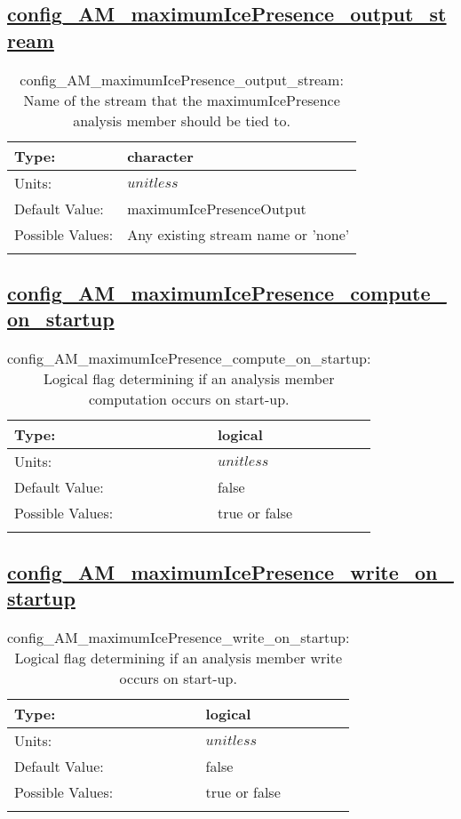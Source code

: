 \subsection[config\_AM\_maximumIcePresence\_output\_stream]{\hyperref[sec:nm_tab_AM_maximumIcePresence]{config\_AM\_maximumIcePresence\_output\_stream}}
\label{subsec:nm_sec_config_AM_maximumIcePresence_output_stream}
\begin{center}
\begin{longtable}{| p{2.0in} || p{4.0in} |}
    \hline
    Type: & character \\
    \hline
    Units: & $unitless$ \\
    \hline
    Default Value: & maximumIcePresenceOutput \\
    \hline
    Possible Values: & Any existing stream name or 'none' \\
    \hline
    \caption{config\_AM\_maximumIcePresence\_output\_stream: Name of the stream that the maximumIcePresence analysis member should be tied to.}
\end{longtable}
\end{center}
\subsection[config\_AM\_maximumIcePresence\_compute\_on\_startup]{\hyperref[sec:nm_tab_AM_maximumIcePresence]{config\_AM\_maximumIcePresence\_compute\_on\_startup}}
\label{subsec:nm_sec_config_AM_maximumIcePresence_compute_on_startup}
\begin{center}
\begin{longtable}{| p{2.0in} || p{4.0in} |}
    \hline
    Type: & logical \\
    \hline
    Units: & $unitless$ \\
    \hline
    Default Value: & false \\
    \hline
    Possible Values: & true or false \\
    \hline
    \caption{config\_AM\_maximumIcePresence\_compute\_on\_startup: Logical flag determining if an analysis member computation occurs on start-up.}
\end{longtable}
\end{center}
\subsection[config\_AM\_maximumIcePresence\_write\_on\_startup]{\hyperref[sec:nm_tab_AM_maximumIcePresence]{config\_AM\_maximumIcePresence\_write\_on\_startup}}
\label{subsec:nm_sec_config_AM_maximumIcePresence_write_on_startup}
\begin{center}
\begin{longtable}{| p{2.0in} || p{4.0in} |}
    \hline
    Type: & logical \\
    \hline
    Units: & $unitless$ \\
    \hline
    Default Value: & false \\
    \hline
    Possible Values: & true or false \\
    \hline
    \caption{config\_AM\_maximumIcePresence\_write\_on\_startup: Logical flag determining if an analysis member write occurs on start-up.}
\end{longtable}
\end{center}
